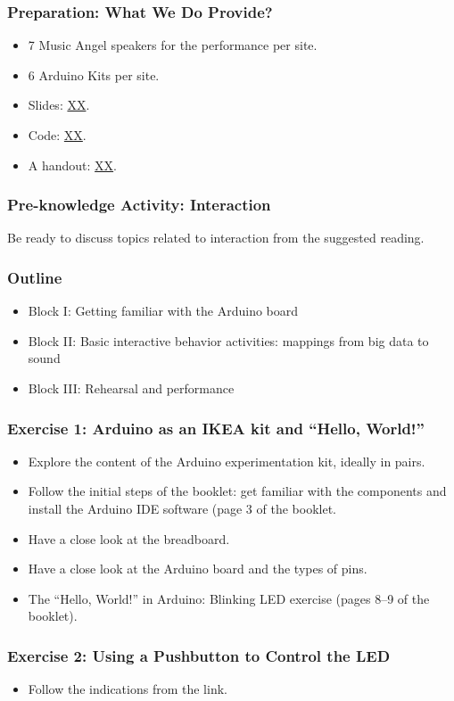 \documentclass[screen, aspectratio=43]{beamer}
\begin{document}
%
\begin{frame}
  \frametitle{Preparation: What We Do Provide?}
        \begin{itemize}
        \item 7 Music Angel speakers for the performance per site.
        \item 6 Arduino Kits per site.
        \item Slides: \url{XX}.
        \item Code: \url{XX}.
        \item A handout: \url{XX}.        
         \end{itemize}
\end{frame}
%
\begin{frame}
  \frametitle{Pre-knowledge Activity: Interaction}
  Be ready to discuss topics related to interaction from the suggested reading.
\end{frame}
%
\begin{frame}
  \frametitle{Outline}
      \begin{itemize}
	\item Block I: Getting familiar with the Arduino board
	\item Block II: Basic interactive behavior activities: mappings from big data to sound
	\item Block III: Rehearsal and performance
    \end{itemize}  
\end{frame}
%
\begin{frame}
  \frametitle{Exercise 1: Arduino as an IKEA kit and ``Hello, World!''}
    \begin{itemize}
    	\item Explore the content of the Arduino experimentation kit, ideally in pairs.
	\item Follow the initial steps of the booklet: get familiar with the components and install the Arduino IDE software (page 3 of the booklet.
	\item Have a close look at the breadboard.
	\item Have a close look at the Arduino board and the types of pins.
	\item The ``Hello, World!'' in Arduino: Blinking LED exercise (pages 8--9 of the booklet).
    \end{itemize}
\end{frame}
%
\begin{frame}
  \frametitle{Exercise 2: Using a Pushbutton to Control the LED}
    \begin{itemize}
    	\item Follow the indications from the link.
    \end{itemize}
\end{frame}
\end{document}
